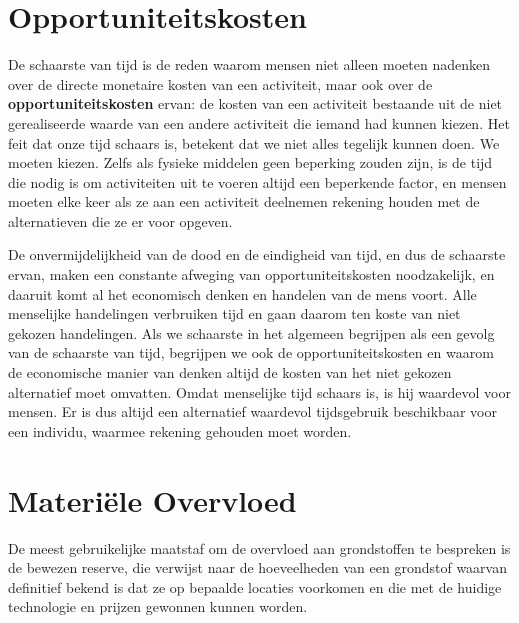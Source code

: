 \section{Opportuniteitskosten}

De schaarste van tijd is de reden waarom mensen niet alleen moeten
nadenken over de directe monetaire kosten van een activiteit, maar ook
over de \textbf{opportuniteitskosten} ervan: de
kosten van een activiteit bestaande uit de niet gerealiseerde waarde van
een andere activiteit die iemand had kunnen kiezen. Het feit dat onze
tijd schaars is, betekent dat we niet alles tegelijk kunnen doen. We
moeten kiezen. Zelfs als fysieke middelen geen beperking zouden zijn, is
de tijd die nodig is om activiteiten uit te voeren altijd een beperkende
factor, en mensen moeten elke keer als ze aan een activiteit deelnemen
rekening houden met de alternatieven die ze er voor opgeven.

De onvermijdelijkheid van de dood en de eindigheid van tijd, en dus de
schaarste ervan, maken een constante afweging van opportuniteitskosten
noodzakelijk, en daaruit komt al het economisch denken en handelen van
de mens voort. Alle menselijke handelingen verbruiken tijd en gaan
daarom ten koste van niet gekozen handelingen. Als we schaarste in het
algemeen begrijpen als een gevolg van de schaarste van tijd, begrijpen
we ook de opportuniteitskosten en waarom de economische manier van
denken altijd de kosten van het niet gekozen alternatief moet omvatten.
Omdat menselijke tijd schaars is, is hij waardevol voor mensen. Er is
dus altijd een alternatief waardevol tijdsgebruik beschikbaar voor een
individu, waarmee rekening gehouden moet worden.

\section{Materiële Overvloed}

De meest gebruikelijke maatstaf om de overvloed aan grondstoffen te
bespreken is de bewezen reserve, die verwijst naar de hoeveelheden van
een grondstof waarvan definitief bekend is dat ze op bepaalde locaties
voorkomen en die met de huidige technologie en prijzen gewonnen kunnen
worden.\autocite{27}

